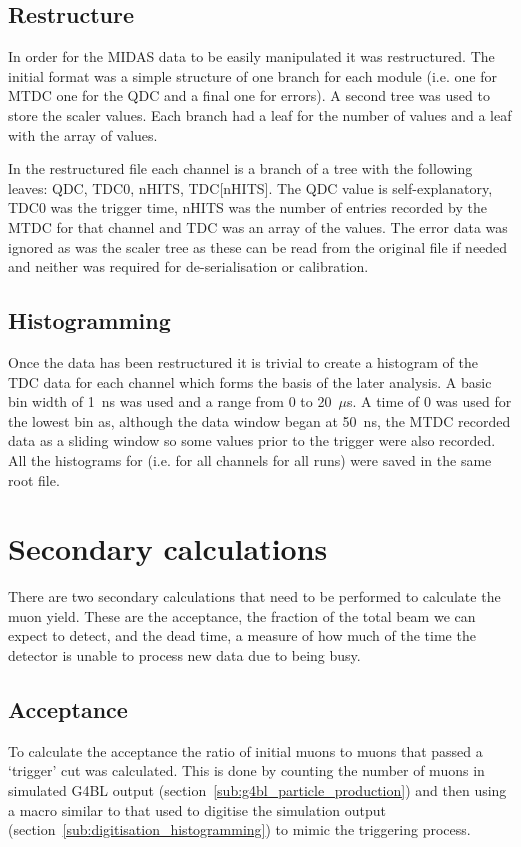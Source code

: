 \subsection{Restructure} %
\label{sub:restructure}
In order for the MIDAS data to be easily manipulated it was restructured. The initial format was a simple structure of one branch for each module (i.e. one for MTDC one for the QDC and a final one for errors). A second tree was used to store the scaler values. Each branch had a leaf for the number of values and a leaf with the array of values.

In the restructured file each channel is a branch of a tree with the following leaves: QDC, TDC0, nHITS, TDC[nHITS]. The QDC value is self-explanatory, TDC0 was the trigger time, nHITS was the number of entries recorded by the MTDC for that channel and TDC was an array of the values. The error data was ignored as was the scaler tree as these can be read from the original file if needed and neither was required for de-serialisation or calibration.
\subsection{Histogramming} %
\label{sub:Histogramming}
Once the data has been restructured it is trivial to create a histogram of the TDC data for each channel which forms the basis of the later analysis. A basic bin width of 1~ns was used and a range from 0 to 20~\(\mu\)s. A time of 0 was used for the lowest bin as, although the data window began at 50~ns, the MTDC recorded data as a sliding window so some values prior to the trigger were also recorded. All the histograms for (i.e. for all channels for all runs) were saved in the same root file.
\section{Secondary calculations} %
\label{sec:secondary_calculations}
There are two secondary calculations that need to be performed to calculate the muon yield. These are the acceptance, the fraction of the total beam we can expect to detect, and the dead time, a measure of how much of the time the detector is unable to process new data due to being busy.
\subsection{Acceptance} %
\label{sub:acceptance}
To calculate the acceptance the ratio of initial muons to muons that passed a `trigger' cut was calculated. This is done by counting the number of muons in simulated G4BL output (section~\ref{sub:g4bl_particle_production}) and then using a macro similar to that used to digitise the simulation output (section~\ref{sub:digitisation_histogramming}) to mimic the triggering process.

